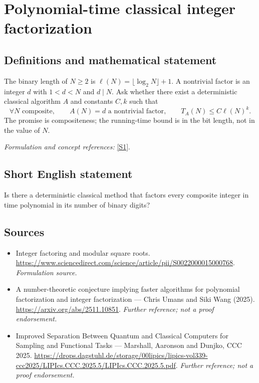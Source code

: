 \documentclass[11pt]{article}
\begin{document}
\section*{\texorpdfstring{Polynomial-time classical integer factorization}{Polynomial-time classical integer factorization}}\label{17}
\subsection{Definitions and mathematical statement}
The binary length of $N\ge2$ is $\ell(N)=\lfloor\log_2N\rfloor+1$. A nontrivial factor is an integer $d$ with $1<d<N$ and $d\mid N$. Ask whether there exist a deterministic classical algorithm $A$ and constants $C,k$ such that
\[
 \forall N\text{ composite},\qquad A(N)=d\text{ a nontrivial factor},\qquad
 T_A(N)\le C\ell(N)^k.
\]
The promise is compositeness; the running-time bound is in the bit length, not in the value of $N$.
\par\smallskip\textit{Formulation and concept references:} \href{https://www.sciencedirect.com/science/article/pii/S0022000015000768}{[S1]}.

\subsection{Short English statement}
Is there a deterministic classical method that factors every composite integer in time polynomial in its number of binary digits?
\subsection{Sources}
\begin{itemize}
\item[S1]Integer factoring and modular square roots.
\url{https://www.sciencedirect.com/science/article/pii/S0022000015000768}.
\textit{Formulation source.}
\item[S2]A number-theoretic conjecture implying faster algorithms for polynomial factorization and integer factorization — Chris Umans and Siki Wang (2025).
\url{https://arxiv.org/abs/2511.10851}.
\textit{Further reference; not a proof endorsement.}
\item[S3]Improved Separation Between Quantum and Classical Computers for Sampling and Functional Tasks — Marshall, Aaronson and Dunjko, CCC 2025.
\url{https://drops.dagstuhl.de/storage/00lipics/lipics-vol339-ccc2025/LIPIcs.CCC.2025.5/LIPIcs.CCC.2025.5.pdf}.
\textit{Further reference; not a proof endorsement.}
\end{itemize}
\end{document}
